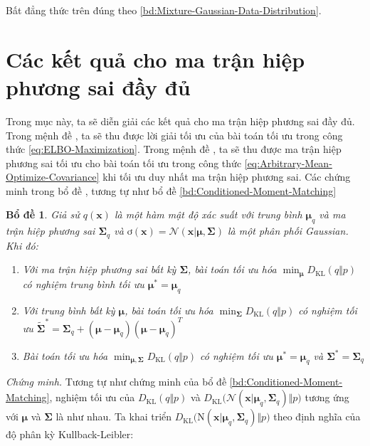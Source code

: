 \documentclass[14pt, a4paper]{article}
\numberwithin{equation}{section}
\numberwithin{figure}{section}
\newtheorem{bd}{Bổ đề}
\numberwithin{dl}{section}
\numberwithin{md}{section}
\numberwithin{bd}{section}
\numberwithin{dn}{section}
\numberwithin{hq}{section}
\begin{document}
    Bất đẳng thức trên đúng theo \ref{bd:Mixture-Gaussian-Data-Distribution}.

    \section{Các kết quả cho ma trận hiệp phương sai đầy đủ} \label{Appen:Section:Results-for-Full-Covariances}

    Trong mục này, ta sẽ diễn giải các kết quả cho ma trận hiệp phương sai đầy đủ. 
    Trong mệnh đề , ta sẽ thu được lời giải tối ưu của bài toán tối ưu trong công thức \ref{eq:ELBO-Maximization}.
    Trong mệnh đề , ta sẽ thu được ma trận hiệp phương sai tối ưu cho bài toán tối ưu trong công thức \ref{eq:Arbitrary-Mean-Optimize-Covariance} khi tối ưu duy nhất ma trận hiệp phương sai.
    Các chứng minh trong bổ đề , tương tự như bổ đề \ref{bd:Conditioned-Moment-Matching}

    \begin{bd} \label{bd:Joint-Optimal-Solution-Full-Covariance}
        Giả sử $q(\boldsymbol{x})$ là một hàm mật độ xác suất với trung bình $\boldsymbol{\mu}_q$ và ma trận hiệp phương sai $\boldsymbol{\Sigma}_q$ và $ơ(\boldsymbol{x})=\mathcal{N}(\boldsymbol{x} \vert \boldsymbol{\mu}, \boldsymbol{\Sigma})$ là một phân phối Gaussian. Khi đó:

        \begin{enumerate}
            \item Với ma trận hiệp phương sai bất kỳ $\boldsymbol{\Sigma}$, bài toán tối ưu hóa $\displaystyle\min_{\boldsymbol{\mu}} D_{\mathrm{KL}} (q \Vert p)$ có nghiệm trung bình tối ưu $\boldsymbol{\mu}^{\ast}=\boldsymbol{\mu}_q$
            \item Với trung bình bất kỳ $\boldsymbol{\mu}$, bài toán tối ưu hóa $\displaystyle\min_{\boldsymbol{\Sigma}} D_{\mathrm{KL}} (q \Vert p)$ có nghiệm tối ưu $\tilde{\boldsymbol{\Sigma}}^{\ast}=\boldsymbol{\Sigma}_q + (\boldsymbol{\mu} - \boldsymbol{\mu}_q)(\boldsymbol{\mu} - \boldsymbol{\mu}_q)^T$
            \item Bài toán tối ưu hóa $\displaystyle\min_{\boldsymbol{\mu}, \boldsymbol{\Sigma}} D_{\mathrm{KL}} (q \Vert p)$ có nghiệm tối ưu $\boldsymbol{\mu}^{\ast}=\boldsymbol{\mu}_q$ và $\boldsymbol{\Sigma}^{\ast} = \boldsymbol{\Sigma}_q$
        \end{enumerate}
    \end{bd}

    \textit{Chứng minh.}
    Tương tự như chứng minh của bổ đề \ref{bd:Conditioned-Moment-Matching}, nghiệm tối ưu của $D_{\mathrm{KL}}(q \Vert p)$ và $D_{\mathrm{KL}}\big( \mathcal{N} (\boldsymbol{x} \vert \boldsymbol{\mu}_q, \boldsymbol{\Sigma}_q) \Vert p \big)$ tương ứng với $\boldsymbol{\mu}$ và $\boldsymbol{\Sigma}$ là như nhau.
    Ta khai triển $D_{\mathrm{KL}} \big( \mathrm{N}(\boldsymbol{x} \vert \boldsymbol{\mu}_q, \boldsymbol{\Sigma}_q ) \Vert p \big)$ theo định nghĩa của độ phân kỳ Kullback-Leibler:
\end{document}
